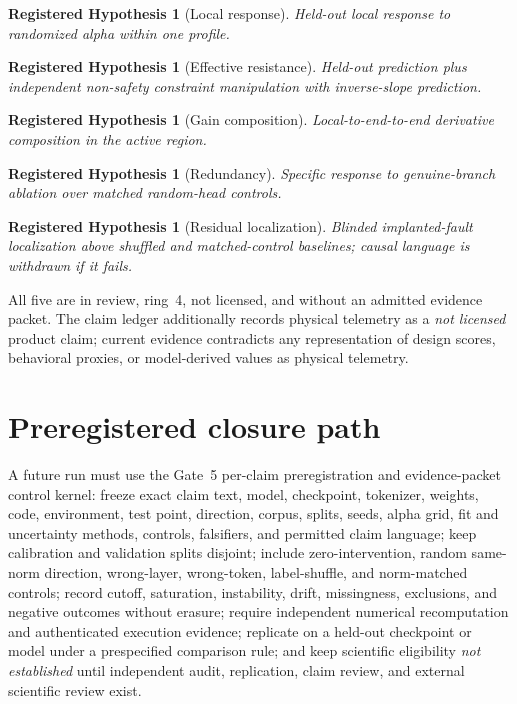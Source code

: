 \documentclass[11pt]{amsart}
\newtheorem{hypothesis}[theorem]{Registered Hypothesis}
\theoremstyle{definition}
\theoremstyle{remark}
\begin{document}
\begin{hypothesis}[Local response]
Held-out local response to randomized alpha within one profile.
\end{hypothesis}
\begin{hypothesis}[Effective resistance]
Held-out prediction plus independent non-safety constraint manipulation with inverse-slope prediction.
\end{hypothesis}
\begin{hypothesis}[Gain composition]
Local-to-end-to-end derivative composition in the active region.
\end{hypothesis}
\begin{hypothesis}[Redundancy]
Specific response to genuine-branch ablation over matched random-head controls.
\end{hypothesis}
\begin{hypothesis}[Residual localization]
Blinded implanted-fault localization above shuffled and matched-control baselines; causal language is withdrawn if it fails.
\end{hypothesis}

All five are in review, ring~4, not licensed, and without an admitted evidence packet. The claim ledger additionally records physical telemetry as a \emph{not licensed} product claim; current evidence contradicts any representation of design scores, behavioral proxies, or model-derived values as physical telemetry.

\section{Preregistered closure path}

A future run must use the Gate~5 per-claim preregistration and evidence-packet control kernel: freeze exact claim text, model, checkpoint, tokenizer, weights, code, environment, test point, direction, corpus, splits, seeds, alpha grid, fit and uncertainty methods, controls, falsifiers, and permitted claim language; keep calibration and validation splits disjoint; include zero-intervention, random same-norm direction, wrong-layer, wrong-token, label-shuffle, and norm-matched controls; record cutoff, saturation, instability, drift, missingness, exclusions, and negative outcomes without erasure; require independent numerical recomputation and authenticated execution evidence; replicate on a held-out checkpoint or model under a prespecified comparison rule; and keep scientific eligibility \emph{not established} until independent audit, replication, claim review, and external scientific review exist.
\end{document}
